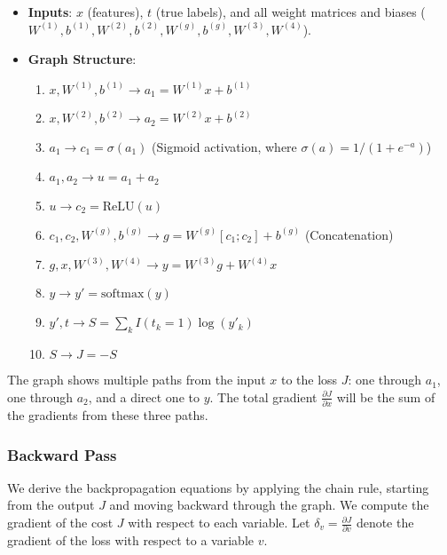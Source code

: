\documentclass{article}
\begin{document}
\begin{itemize}
    \item \textbf{Inputs}: $x$ (features), $t$ (true labels), and all weight matrices and biases ($W^{(1)}, b^{(1)}, W^{(2)}, b^{(2)}, W^{(g)}, b^{(g)}, W^{(3)}, W^{(4)}$).
    \item \textbf{Graph Structure}:
    \begin{enumerate}
        \item $x, W^{(1)}, b^{(1)} \rightarrow a_1 = W^{(1)}x + b^{(1)}$
        \item $x, W^{(2)}, b^{(2)} \rightarrow a_2 = W^{(2)}x + b^{(2)}$
        \item $a_1 \rightarrow c_1 = \sigma(a_1)$ (Sigmoid activation, where $\sigma(a) = 1/(1+e^{-a})$)
        \item $a_1, a_2 \rightarrow u = a_1 + a_2$
        \item $u \rightarrow c_2 = \text{ReLU}(u)$
        \item $c_1, c_2, W^{(g)}, b^{(g)} \rightarrow g = W^{(g)}[c_1; c_2] + b^{(g)}$ (Concatenation)
        \item $g, x, W^{(3)}, W^{(4)} \rightarrow y = W^{(3)}g + W^{(4)}x$
        \item $y \rightarrow y' = \text{softmax}(y)$
        \item $y', t \rightarrow S = \sum_{k} I(t_k=1) \log(y'_k)$
        \item $S \rightarrow J = -S$
    \end{enumerate}
\end{itemize}
The graph shows multiple paths from the input $x$ to the loss $J$: one through $a_1$, one through $a_2$, and a direct one to $y$. The total gradient $\frac{\partial J}{\partial x}$ will be the sum of the gradients from these three paths.

\subsubsection*{Backward Pass}

We derive the backpropagation equations by applying the chain rule, starting from the output $J$ and moving backward through the graph. We compute the gradient of the cost $J$ with respect to each variable. Let $\delta_v = \frac{\partial J}{\partial v}$ denote the gradient of the loss with respect to a variable $v$.
\end{document}
